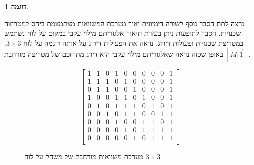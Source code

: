 \documentclass[12pt,leqno]{article}
\theoremstyle{theoremdd}
\newtheorem{example}{דוגמה}[section]
\begin{document}
\begin{example}
\end{example}


נרצה לתת הסבר נוסף לשורה דימיונית
ואיך
מערכת המשוואות מצתמצמת
ביחס למטריצה שכנויות.
הסבר לתופעות ניתן בעזרת תיאור אלגוריתם מילוי עקבי
במקום על לוח נשתמש במטריצת שכנויות ופעולות דירוג.
נראה את הפעולות דירוג על אותה דוגמה 
על לוח 
$3 \times 3$.
באופן שכזה נראה 
שאלגוריתם מילוי עקבי הוא דירג מתוחכם של מטריצה מורחבת 
$[M | \vec{1}]$.

\begin{figure}[ht]
    \caption{
        מערכת משוואות מורחבת של משחק על לוח 
        $3 \times 3$
    }
    \label{fig: full matrix 3 x 3}
    \begin{english}
        \begin{center}
            \[\left[
            \begin{array}{ccccccccc|c}
                    1& 1& 0& 1& 0& 0& 0& 0& 0& 1 \\
                    1& 1& 1& 0& 1& 0& 0& 0& 0& 1 \\
                    0& 1& 1& 0& 0& 1& 0& 0& 0& 1 \\
                    1& 0& 0& 1& 1& 0& 1& 0& 0& 1 \\
                    0& 1& 0& 1& 1& 1& 0& 1& 0& 1 \\
                    0& 0& 1& 0& 1& 1& 0& 0& 1& 1 \\
                    0& 0& 0& 1& 0& 0& 1& 1& 0& 1 \\
                    0& 0& 0& 0& 1& 0& 1& 1& 1& 1 \\
                    0& 0& 0& 0& 0& 1& 0& 1& 1& 1 \\
            \end{array}
            \right]\]
        \end{center}
    \end{english}
\end{figure}
\end{document}
